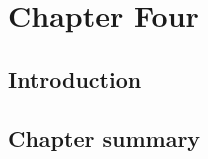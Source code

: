 %
%
\chapter{Chapter Four} \label{chap:four}

\section{Introduction} \label{sec:intro}


\section{Chapter summary}

